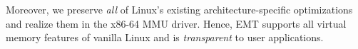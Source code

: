 
Moreover, we preserve {\it all} of Linux's existing architecture-specific optimizations
	and realize them in the x86-64 MMU driver.
Hence, EMT supports all virtual memory features of vanilla Linux and
	is {\it transparent} to user applications.





